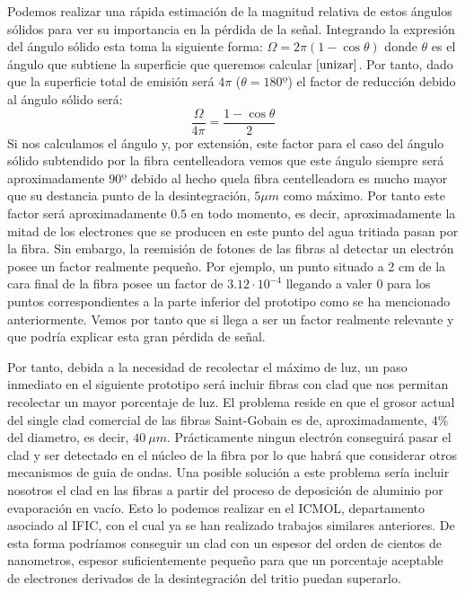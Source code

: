 Podemos realizar una rápida estimación de la magnitud relativa de estos ángulos sólidos para ver su importancia en la pérdida de la señal. Integrando la expresión del ángulo sólido esta toma la siguiente forma: $\Omega=2\pi(1-\cos{\theta})$ donde $\theta$ es el ángulo que subtiene la superficie que queremos calcular$~\cite{unizar}$. Por tanto, dado que la superficie total de emisión será $4\pi$ ($\theta=180º$) el factor de reducción debido al ángulo sólido será:
\begin{equation}
\frac{\Omega}{4\pi}=\frac{1-\cos{\theta}}{2}
\label{factordebidoalangulosolido}
\end{equation}
Si nos calculamos el ángulo y, por extensión, este factor para el caso del ángulo sólido subtendido por la fibra centelleadora vemos que este ángulo siempre será aproximadamente $90º$ debido al hecho quela fibra centelleadora es mucho mayor que su destancia punto de la desintegración, $5\mu m$ como máximo. Por tanto este factor será aproximadamente $0.5$ en todo momento, es decir, aproximadamente la mitad de los electrones que se producen en este punto del agua tritiada pasan por la fibra. Sin embargo, la reemisión de fotones de las fibras al detectar un electrón posee un factor realmente pequeño. Por ejemplo, un punto situado a 2 cm de la cara final de la fibra posee un factor de $3.12\cdotp 10^{-4}$ llegando a valer $0$ para los puntos correspondientes a la parte inferior del prototipo como se ha mencionado anteriormente. Vemos por tanto que si llega a ser un factor realmente relevante y que podría explicar esta gran pérdida de señal. 

Por tanto, debida a la necesidad de recolectar el máximo de luz, un paso inmediato en el siguiente prototipo será incluir fibras con clad que nos permitan recolectar un mayor porcentaje de luz. El problema reside en que el grosor actual del single clad comercial de las fibras Saint-Gobain es de, aproximadamente, $4\%$ del diametro, es decir, $40~\mu m$. Prácticamente ningun electrón conseguirá pasar el clad y ser detectado en el núcleo de la fibra por lo que habrá que considerar otros mecanismos de guia de ondas. Una posible solución a este problema sería incluir nosotros el clad en las fibras a partir del proceso de deposición de aluminio por evaporación en vacío. Esto lo podemos realizar en el ICMOL, departamento asociado al IFIC, con el cual ya se han realizado trabajos similares anteriores. De esta forma podríamos conseguir un clad con un espesor del orden de cientos de nanometros, espesor suficientemente pequeño para que un porcentaje aceptable de electrones derivados de la desintegración del tritio puedan superarlo. 